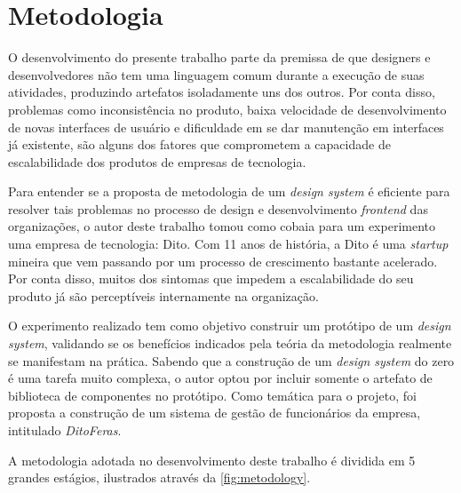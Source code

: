 
\chapter{Metodologia}
\label{chap:metodologia}

O desenvolvimento do presente trabalho parte da premissa de que designers e desenvolvedores não tem uma linguagem comum durante a execução de suas atividades, produzindo artefatos isoladamente uns dos outros. Por conta disso, problemas como inconsistência no produto, baixa velocidade de desenvolvimento de novas interfaces de usuário e dificuldade em se dar manutenção em interfaces já existente, são alguns dos fatores que comprometem a capacidade de escalabilidade dos produtos de empresas de tecnologia.

Para entender se a proposta de metodologia de um \textit{design system} é eficiente para resolver tais problemas no processo de design e desenvolvimento \textit{frontend} das organizações, o autor deste trabalho tomou como cobaia para um experimento uma empresa de tecnologia: Dito. Com 11 anos de história, a Dito é uma \textit{startup} mineira que vem passando por um processo de crescimento bastante acelerado. Por conta disso, muitos dos sintomas que impedem a escalabilidade do seu produto já são perceptíveis internamente na organização. 

O experimento realizado tem como objetivo construir um protótipo de um \textit{design system}, validando se os benefícios indicados pela teória da metodologia realmente se manifestam na prática. Sabendo que a construção de um \textit{design system} do zero é uma tarefa muito complexa, o autor optou por incluir somente o artefato de biblioteca de componentes no protótipo. Como temática para o projeto, foi proposta a construção de um sistema de gestão de funcionários da empresa, intitulado \textit{DitoFeras}.

A metodologia adotada no desenvolvimento deste trabalho é dividida em 5 grandes estágios, ilustrados através da \autoref{fig:metodology}.

